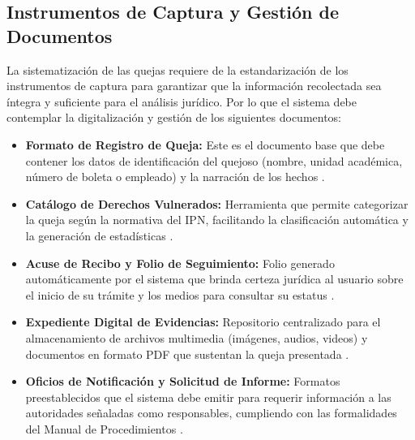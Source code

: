 \subsection{Instrumentos de Captura y Gestión de Documentos}
La sistematización de las quejas requiere de la estandarización de los instrumentos de captura para garantizar que la información recolectada sea íntegra y suficiente para el análisis jurídico. Por lo que el sistema debe contemplar la digitalización y gestión de los siguientes documentos:
\begin{itemize}
    \item \textbf{Formato de Registro de Queja:} Este es el documento base que debe contener los datos de identificación del quejoso (nombre, unidad académica, número de boleta o empleado) y la narración de los hechos \cite{5} .
    \item \textbf{Catálogo de Derechos Vulnerados:} Herramienta que permite categorizar la queja según la normativa del IPN, facilitando la clasificación automática y la generación de estadísticas \cite{5} .
    \item \textbf{Acuse de Recibo y Folio de Seguimiento:} Folio generado automáticamente por el sistema que brinda certeza jurídica al usuario sobre el inicio de su trámite y los medios para consultar su estatus \cite{5} .
    \item \textbf{Expediente Digital de Evidencias:} Repositorio centralizado para el almacenamiento de archivos multimedia (imágenes, audios, videos) y documentos en formato PDF que sustentan la queja presentada \cite{5} .
    \item \textbf{Oficios de Notificación y Solicitud de Informe:} Formatos preestablecidos que el sistema debe emitir para requerir información a las autoridades señaladas como responsables, cumpliendo con las formalidades del Manual de Procedimientos \cite{5} .
\end{itemize}
